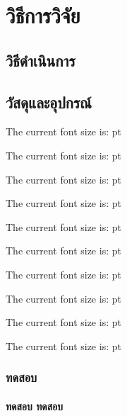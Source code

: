 \chapter{วิธีการวิจัย}
\section{วิธีดำเนินการ}
\section{วัสดุและอุปกรณ์}

\makeatletter
\newcommand\thefontsize[1]{{#1 \string#1 The current font size is: \f@size pt\par}}
\makeatother

\thefontsize\tiny
\thefontsize\scriptsize
\thefontsize\footnotesize
\thefontsize\small
\thefontsize\normalsize 
\thefontsize\large
\thefontsize\Large
\thefontsize\LARGE
\thefontsize\huge
\thefontsize\Huge

\subsection{ทดสอบ}


\subsubsection{ทดสอบ ทดสอบ}
